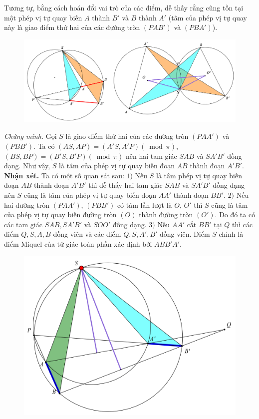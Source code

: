 \begin{multicols}{2}
	\vskip 0.1cm
	Tương tự, bằng cách hoán đổi vai trò của các điểm, dễ thấy rằng cũng tồn tại một phép vị tự quay biến $A$ thành $B'$ và $B$ thành $A'$ (tâm của phép vị tự quay này là giao điểm thứ hai của các đường tròn $(PAB')$ và $(PBA')$).
	\begin{figure}[H]
		\vspace*{-5pt}
		\centering
		\captionsetup{labelformat= empty, justification=centering}
		\includegraphics[width=1\linewidth]{2}
		\vspace*{-20pt}
	\end{figure}
	\textit{Chứng minh.} Gọi $S$ là giao điểm thứ hai của các đường tròn $(PAA')$ và $(PBB')$. Ta có $(AS,AP)=(A'S,A'P) (\bmod  \pi)$, $(BS,BP)=(B'S,B'P)(\bmod  \pi)$ nên hai tam giác $SAB$ và $SA'B'$ đồng dạng. Như vậy, $S$ là tâm của phép vị tự quay biến đoạn $AB$ thành đoạn $A'B'$. 
	\vskip 0.1cm
	\textbf{\color{hoccungpi}Nhận xét.}  Ta có một số quan sát sau:
	\vskip 0.1cm
	$1)$ Nếu $S$ là tâm phép vị tự quay biến đoạn $AB$ thành đoạn $A'B'$ thì dễ thấy hai tam giác $SAB$ và $SA'B'$ đồng dạng nên $S$ cũng là tâm của phép vị tự quay biến đoạn $AA'$ thành đoạn $BB'$.
	\vskip 0.1cm 
	$2)$ Nếu hai đường tròn $(PAA')$, $(PBB')$  có tâm lần lượt là $O$, $O'$ thì $S$ cũng là tâm của phép vị tự quay biến đường tròn $(O)$ thành đường tròn $(O')$. Do đó ta có các tam giác $SAB,SA'B'$ và $SOO'$ đồng dạng.
	\vskip 0.1cm
	$3)$ Nếu $AA'$ cắt $BB'$ tại $Q$ thì các điểm $Q,S,A,B$ đồng viên và các điểm $Q,S,A',B'$ đồng viên. Điểm $S$ chính là điểm Miquel của tứ giác toàn phần xác định bởi $ABB'A'$.
	\begin{figure}[H]
		\vspace*{-5pt}
		\centering
		\captionsetup{labelformat= empty, justification=centering}
		\includegraphics[scale=0.75]{3}

\end{figure}
\end{multicols}
